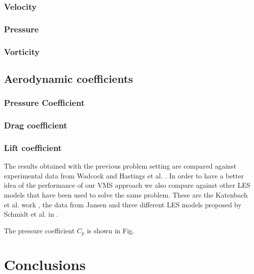 \subsubsection{Velocity}
\subsubsection{Pressure}
\subsubsection{Vorticity}
\subsection{Aerodynamic coefficients}
\subsubsection{Pressure Coefficient}
\subsubsection{Drag coefficient}
\subsubsection{Lift coefficient}

The results obtained with the previous problem setting are compared against experimental data from Wadcock \cite{wadcock_investigation_1987} and Hastings et al. \cite{Hastings}. In order to have a better idea of the performance of our VMS approach we also compare against other LES models that have been used to solve the same problem. These are the Katenbach  et al. work \cite{kaltenbach_large-eddy_1995}, the data from Jansen \cite{jansen_stabilized_1999} and three different LES models proposed by Schmidt et al. in \cite{schmidt_assessment_????}.

The pressure coefficient $C_p$ is shown in Fig. 





\section{Conclusions}
\label{sec-C8_conclusions}